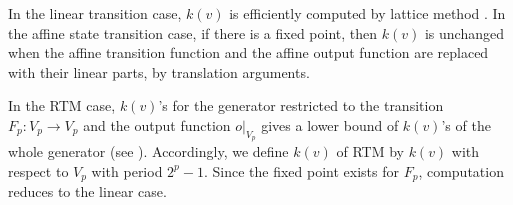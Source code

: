 \documentclass{svmult}
\def\bbf2{\ifmmode \mathbb{F}_2 \else $\mathbb{F}_2$ \fi}
\begin{document}
In the linear transition case, $k(v)$ is
efficiently computed by lattice method \cite{CLT}.
In the affine state transition case, if there is a
fixed point, then $k(v)$ is unchanged when
the affine transition function 
and the affine output function are replaced with their linear parts,
by translation arguments.

In the RTM case, $k(v)$'s for the generator restricted to 
the transition $F_p: V_p \to V_p$ and the output
function $o|_{V_p}$ gives a lower bound of $k(v)$'s of the 
whole generator (see \cite{SFMT}). Accordingly, we define $k(v)$ of
RTM by $k(v)$ with respect to $V_p$ with period $2^p-1$. 
Since the fixed point exists for $F_p$, computation reduces to the linear case.




\end{document}
